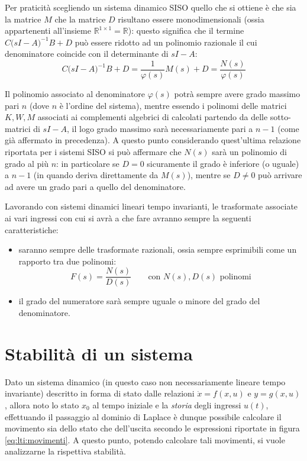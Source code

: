 	Per praticità scegliendo un sistema dinamico SISO quello che si ottiene è che sia la matrice $M$ che la matrice $D$ risultano essere monodimensionali (ossia appartenenti all'insieme $\mathds R^{1\times 1} = \mathds R$): questo significa che il termine $C\big(sI-A\big)^{-1}B + D$ può essere ridotto ad un polinomio razionale il cui denominatore coincide con il determinante di $sI-A$:
	\[ C\big(sI-A\big)^{-1}B + D = \frac 1 {\varphi(s)} M(s) + D = \frac{N(s)}{\varphi(s)}  \]
	
	\begin{osservazione}
		Il polinomio associato al denominatore $\varphi(s)$ potrà sempre avere grado massimo pari $n$ (dove $n$ è l'ordine del sistema), mentre essendo i polinomi delle matrici $K,W,M$ associati ai complementi algebrici di calcolati partendo da delle sotto-matrici di $sI-A$, il logo grado massimo sarà necessariamente pari a $n-1$ (come già affermato in precedenza). A questo punto considerando quest'ultima relazione riportata per i sistemi SISO si può affermare che $N(s)$ sarà un polinomio di grado al più $n$: in particolare se $D=0$ sicuramente il grado è inferiore (o uguale) a $n-1$ (in quando deriva direttamente da $M(s)$), mentre se $D\neq 0$ può arrivare ad avere un grado pari a quello del denominatore.
	\end{osservazione}
	\begin{concetto}
		Lavorando con sistemi dinamici lineari tempo invarianti, le trasformate associate ai vari ingressi con cui si avrà a che fare avranno sempre la seguenti caratteristiche:
		\begin{itemize}
			\item saranno sempre delle trasformate razionali, ossia sempre esprimibili come un rapporto tra due polinomi:
			\[F(s) = \frac{N(s)}{D(s)} \qquad \textrm{con $N(s),D(s)$ polinomi}\]
			\item il grado del numeratore sarà sempre uguale o minore del grado del denominatore.
		\end{itemize}
	\end{concetto}
	
\section{Stabilità di un sistema}
	
	Dato un sistema dinamico (in questo caso non necessariamente lineare tempo invariante) descritto in forma di stato dalle relazioni $\dot x = f(x,u)$ e $y=g(x,u)$, allora noto lo stato $x_0$ al tempo iniziale e la \textit{storia} degli ingressi $u(t)$, effettuando il passaggio al dominio di Laplace è dunque possibile calcolare il movimento sia dello stato che dell'uscita secondo le espressioni riportate in figura \ref{eq:lti:movimenti}. A questo punto, potendo calcolare tali movimenti, si vuole analizzarne la rispettiva stabilità.
	

